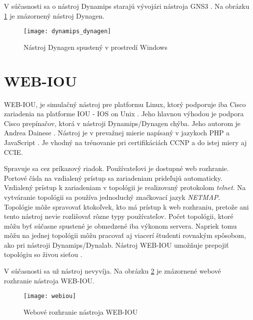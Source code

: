 V súčasnosti sa o nástroj Dynamips starajú vývojári nástroja GNS3 \cite{dynamips_github}. Na obrázku \ref{obr:dynamips_dynagen} je znázornený nástroj Dynagen.

\begin{figure}
    \centering
    \texttt{[image: dynamips\_dynagen]}
    \caption{Nástroj Dynagen spustený v prostredí Windows} \cite{obr_dynamips_dynagen}
    \label{obr:dynamips_dynagen}
\end{figure}





\section{WEB-IOU}

WEB-IOU, je simulačný nástroj pre platformu Linux, ktorý podporuje iba Cisco zariadenia na platforme IOU - IOS on Unix \cite{webiou_firewall_cx}. Jeho hlavnou výhodou je podpora Cisco prepínačov, ktorá v nástroji Dynamips/Dynagen chýba. Jeho autorom je Andrea Dainese \cite{webiou_github, webiou_unetlab_unetlabv2}. Nástroj je v prevažnej mierie napísaný v jazykoch PHP a JavaScript \cite{webiou_github}. Je vhodný na trénovanie pri certifikáciách CCNP a do istej miery aj CCIE.

Spravuje sa cez príkazový riadok. Používateľovi je dostupné web rozhranie. Portové čísla na vzdialený prístup sa zariadeniam prideľujú automaticky. Vzdialený prístup k zariadeniam v topológii je realizovaný protokolom \emph{telnet}. Na vytváranie topológii sa používa jednoduchý značkovací jazyk \emph{NETMAP}. Topológie môže spravovať ktokoľvek, kto má prístup k web rozhraniu, pretože ani tento nástroj nevie rozlišovať rôzne typy používateľov. Počet topológii, ktoré môžu byť súčasne spustené je obmedzené iba výkonom servera. Napriek tomu môžu na jednej topológii môžu pracovať aj viacerí študenti rovnakým spôsobom, ako pri nástroji Dynamips/Dynalab. Nástroj WEB-IOU umožňuje prepojiť topológiu so živou sieťou \cite{webiou_real_network}. 

V súčasnosti sa už nástroj nevyvíja. Na obrázku \ref{obr:webiou} je znázornené webové rozhranie nástroja WEB-IOU.

\begin{figure}
    \centering
    \texttt{[image: webiou]}
    \caption{Webové rozhranie nástroja WEB-IOU} \cite{obr_webiou}
    \label{obr:webiou}
\end{figure}





